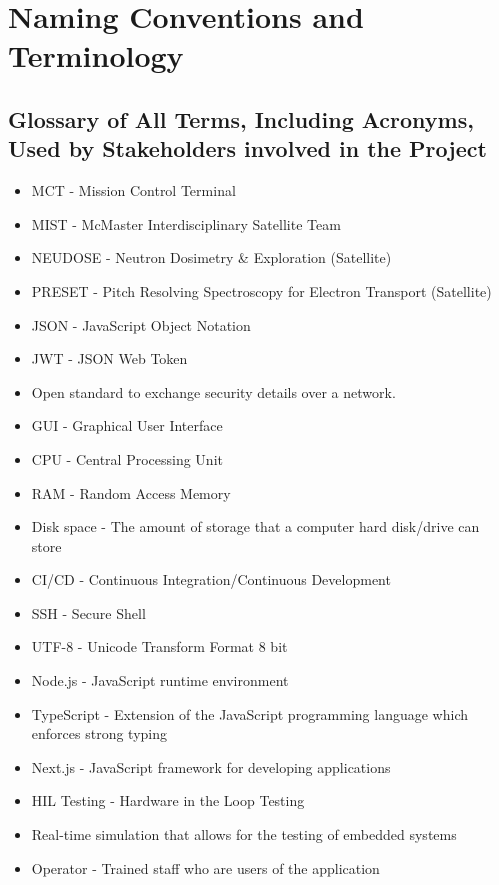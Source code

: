 \documentclass[12pt]{article}
\begin{document}
\section{Naming Conventions and Terminology}
\subsection{Glossary of All Terms, Including Acronyms, Used by Stakeholders
involved in the Project}
\begin{itemize}
    \item MCT - Mission Control Terminal
    \item MIST - McMaster Interdisciplinary Satellite Team
    \item NEUDOSE - Neutron Dosimetry \& Exploration (Satellite)
    \item PRESET - Pitch Resolving Spectroscopy for Electron Transport (Satellite)
    \item JSON - JavaScript Object Notation
    \item JWT - JSON Web Token
    \item Open standard to exchange security details over a network.
    \item GUI - Graphical User Interface
    \item CPU - Central Processing Unit
    \item RAM - Random Access Memory
    \item Disk space - The amount of storage that a computer hard disk/drive can store
    \item CI/CD - Continuous Integration/Continuous Development
    \item SSH - Secure Shell
    \item UTF-8 - Unicode Transform Format 8 bit
    \item Node.js - JavaScript runtime environment
    \item TypeScript - Extension of the JavaScript programming language which enforces strong typing
    \item Next.js - JavaScript framework for developing applications
    \item HIL Testing - Hardware in the Loop Testing
    \item Real-time simulation that allows for the testing of embedded systems
    \item Operator - Trained staff who are users of the application

\end{itemize}
\end{document}
